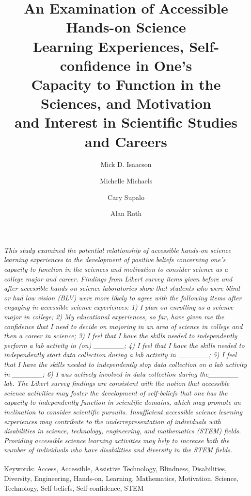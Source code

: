 \documentclass[11.5pt]{sig-alternate} %
\makeatletter
\let\oldabstract\abstract
\let\oldendabstract\endabstract
\renewenvironment{abstract} %
{\renewenvironment{quotation}%
               {\list{}{\addtolength{\leftmargin}{1em} %
                        \listparindent 1.5em%
                        \itemindent    \listparindent%
                        \rightmargin   \leftmargin%
                        \parsep        \z@ \@plus\p@}%
                \item\relax}%
               {\endlist}%
\oldabstract}
{\oldendabstract}
\makeatother
\begin{document}
\title{An Examination of Accessible Hands-on Science \\Learning Experiences, Self-confidence in One’s \\Capacity to Function in the Sciences, and Motivation\\ and Interest in Scientific Studies and Careers}

\author[1]{\large \color{blue}Mick D. Isaacson}
\author[2]{\large \color{blue}Michelle Michaels}
\author[3]{\large \color{blue}Cary Supalo}
\author[4]{\large \color{blue}Alan Roth}


\toappear{}
\maketitle
\begin{@twocolumnfalse} 
\begin{abstract}
\item 
\textit{This study examined the potential relationship of accessible hands-on science learning experiences to the development of positive beliefs concerning one’s capacity to function in the sciences and motivation to consider science as a college major and career. Findings from Likert survey items given before and after accessible hands-on science laboratories show that students who were blind or had low vision (BLV) were more likely to agree with the following items after engaging in accessible science experiences: 1) I plan on enrolling as a science major in college; 2) My educational experiences, so far, have given me the confidence that I need to decide on majoring in an area of science in college and then a career in science; 3) I feel that I have the skills needed to independently perform a lab activity in (on) \_\_\_\_\_\_; 4) I feel that I have the skills needed to independently start data collection during a lab activity in \_\_\_\_\_\_; 5) I feel that I have the skills needed to independently stop data collection on a lab activity in \_\_\_\_\_\_; 6) I was actively involved in data collection during the\_\_\_\_\_\_ lab. The Likert survey findings are consistent with the notion that accessible science activities may foster the development of self-beliefs that one has the capacity to independently function in scientific domains, which may promote an inclination to consider scientific pursuits. Insufficient accessible science learning experiences may contribute to the underrepresentation of individuals with disabilities in science, technology, engineering, and mathematics (STEM) fields. Providing accessible science learning activities may help to increase both the number of individuals who have disabilities and diversity in the STEM fields.}
\\ \\
Keywords: Access, Accessible, Assistive Technology, Blindness, Disabilities, Diversity, Engineering, Hands-on, Learning, Mathematics, Motivation, Science, Technology, Self-beliefs, Self-confidence, STEM
\end{abstract}
\end{@twocolumnfalse}
\end{document}
